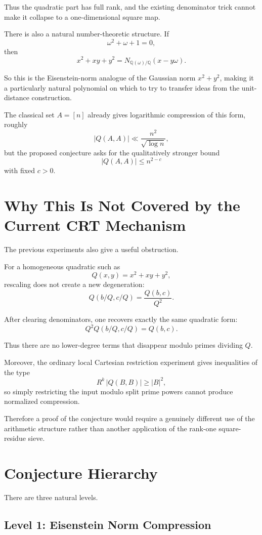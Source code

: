 \documentclass[11pt]{article}
\begin{document}
Thus the quadratic part has full rank, and the existing denominator trick cannot make it collapse to a one-dimensional square map.

There is also a natural number-theoretic structure. If
\[
\omega^2+\omega+1=0,
\]
then
\[
x^2+xy+y^2
=
N_{\mathbb Q(\omega)/\mathbb Q}(x-y\omega).
\]

So this is the Eisenstein-norm analogue of the Gaussian norm \(x^2+y^2\), making it a particularly natural polynomial on which to try to transfer ideas from the unit-distance construction.

The classical set \(A=[n]\) already gives logarithmic compression of this form, roughly
\[
|Q(A,A)|\ll \frac{n^2}{\sqrt{\log n}},
\]
but the proposed conjecture asks for the qualitatively stronger bound
\[
|Q(A,A)|\le n^{2-c}
\]
with fixed \(c>0\).

\section{Why This Is Not Covered by the Current CRT Mechanism}

The previous experiments also give a useful obstruction.

For a homogeneous quadratic such as
\[
Q(x,y)=x^2+xy+y^2,
\]
rescaling does not create a new degeneration:
\[
Q(b/Q,c/Q)=\frac{Q(b,c)}{Q^2}.
\]

After clearing denominators, one recovers exactly the same quadratic form:
\[
Q^2Q(b/Q,c/Q)=Q(b,c).
\]

Thus there are no lower-degree terms that disappear modulo primes dividing \(Q\).

Moreover, the ordinary local Cartesian restriction experiment gives inequalities of the type
\[
R^k\,|Q(B,B)|\ge |B|^2,
\]
so simply restricting the input modulo split prime powers cannot produce normalized compression.

Therefore a proof of the conjecture would require a genuinely different use of the arithmetic structure rather than another application of the rank-one square-residue sieve.

\section{Conjecture Hierarchy}

There are three natural levels.

\subsection{Level 1: Eisenstein Norm Compression}
\end{document}
